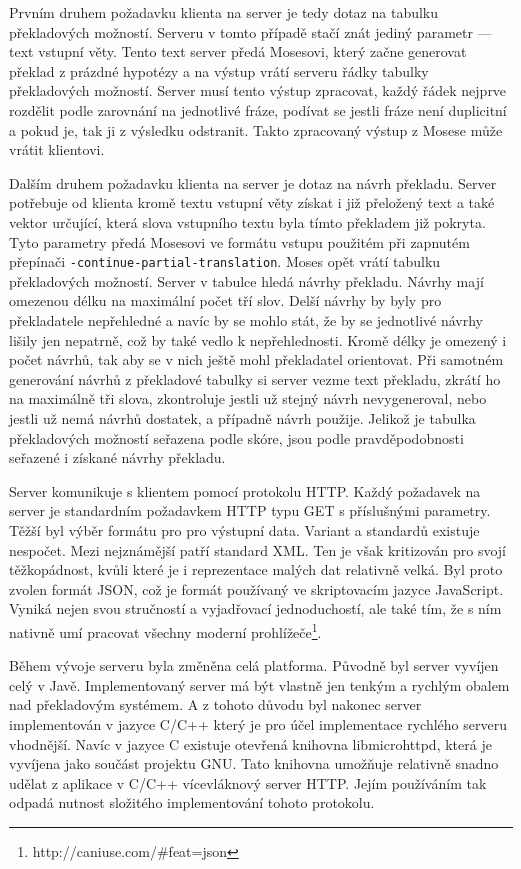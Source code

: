 \documentclass[12pt,a4paper]{report}
\begin{document}
Prvním druhem požadavku klienta na server je tedy dotaz na tabulku překladových možností. Serveru v tomto případě stačí znát jediný parametr --- text vstupní věty. Tento text server předá Mosesovi, který začne generovat překlad z prázdné hypotézy a na výstup vrátí serveru řádky tabulky překladových možností. Server musí tento výstup zpracovat, každý řádek nejprve rozdělit podle zarovnání na jednotlivé fráze, podívat se jestli fráze není duplicitní a pokud je, tak ji z výsledku odstranit. Takto zpracovaný výstup z Mosese může vrátit klientovi.

Dalším druhem požadavku klienta na server je dotaz na návrh překladu. Server potřebuje od klienta kromě textu vstupní věty získat i již přeložený text a také vektor určující, která slova vstupního textu byla tímto překladem již pokryta. Tyto parametry předá Mosesovi ve formátu vstupu použitém při zapnutém přepínači {\tt -continue-partial-translation}. Moses opět vrátí tabulku překladových možností. Server v tabulce hledá návrhy překladu. Návrhy mají omezenou délku na maximální počet tří slov. Delší návrhy by byly pro překladatele nepřehledné a navíc by se mohlo stát, že by se jednotlivé návrhy lišily jen nepatrně, což by také vedlo k nepřehlednosti. Kromě délky je omezený i počet návrhů, tak aby se v nich ještě mohl překladatel orientovat. Při samotném generování návrhů z překladové tabulky si server vezme text překladu, zkrátí ho na maximálně tři slova, zkontroluje jestli už stejný návrh nevygeneroval, nebo jestli už nemá návrhů dostatek, a případně návrh použije. Jelikož je tabulka překladových možností seřazena podle skóre, jsou podle pravděpodobnosti seřazené i získané návrhy překladu.

Server komunikuje s klientem pomocí protokolu HTTP. Každý požadavek na server je standardním požadavkem HTTP typu GET s příslušnými parametry. Těžší byl výběr formátu pro pro výstupní data. Variant a standardů existuje nespočet. Mezi nejznámější patří standard XML. Ten je však kritizován pro svojí těžkopádnost, kvůli které je i reprezentace malých dat relativně velká. Byl proto zvolen formát JSON, což je formát používaný ve skriptovacím jazyce JavaScript. Vyniká nejen svou stručností a vyjadřovací jednoduchostí, ale také tím, že s ním nativně umí pracovat všechny moderní prohlížeče\footnote{http://caniuse.com/\#feat=json}.

Během vývoje serveru byla změněna celá platforma. Původně byl server vyvíjen celý v Javě. Implementovaný server má být vlastně jen tenkým a rychlým obalem nad překladovým systémem. A z tohoto důvodu byl nakonec server implementován v jazyce C/C++ který je pro účel implementace rychlého serveru vhodnější. Navíc v jazyce C existuje otevřená knihovna libmicrohttpd, která je vyvíjena jako součást projektu GNU. Tato knihovna umožňuje relativně snadno udělat z aplikace v C/C++ vícevláknový server HTTP. Jejím používáním tak odpadá nutnost složitého implementování tohoto protokolu.
\end{document}
